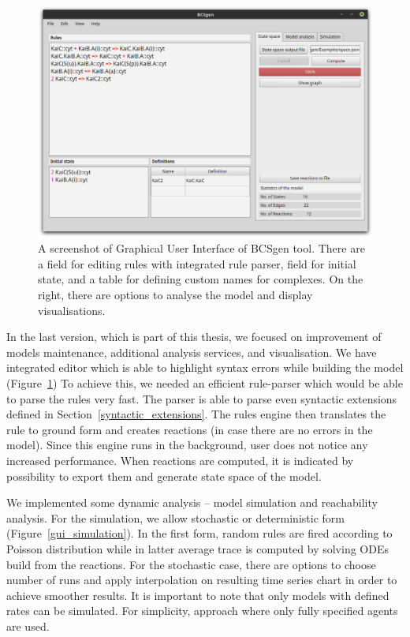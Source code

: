 \documentclass[12pt]{fithesis2}
\begin{document}
\begin{figure}[!h]
\begin{center}
\includegraphics[scale=0.35]{pics/BCSgen_gui}
\caption{A screenshot of Graphical User Interface of BCSgen tool. There are a field for editing rules with integrated rule parser, field for initial state, and a table for defining custom names for complexes. On the right, there are options to analyse the model and display visualisations.}\label{gui_example}
\end{center}
\end{figure}

In the last version, which is part of this thesis, we focused on improvement of models maintenance, additional analysis services, and visualisation. We have integrated editor which is able to highlight syntax errors while building the model (Figure~\ref{gui_example}) To achieve this, we needed an efficient rule-parser which would be able to parse the rules very fast. The parser is able to parse even syntactic extensions defined in Section~\ref{syntactic_extensions}. The rules engine then translates the rule to ground form and creates reactions (in case there are no errors in the model). Since this engine runs in the background, user does not notice any increased performance. When reactions are computed, it is indicated by possibility to export them and generate state space of the model.

We implemented some dynamic analysis -- model simulation and reachability analysis. For the simulation, we allow stochastic or deterministic form (Figure~\ref{gui_simulation}). In the first form, random rules are fired according to Poisson distribution while in latter average trace is computed by solving ODEs build from the reactions. For the stochastic case, there are options to choose number of runs and apply interpolation on resulting time series chart in order to achieve smoother results. It is important to note that only models with defined rates can be simulated. For simplicity, approach where only fully specified agents are used.
\end{document}
